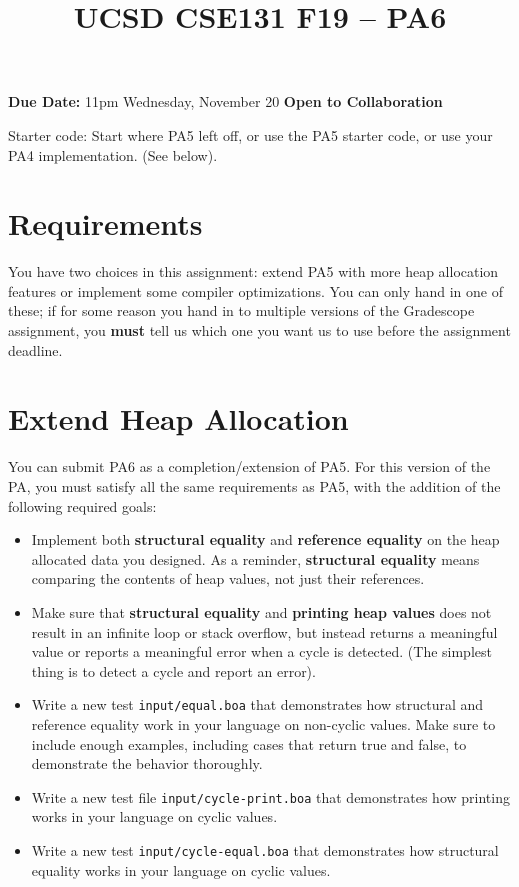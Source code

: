 \documentclass[10pt, oneside]{article}
\title{UCSD CSE131 F19 -- PA6}
\begin{document}
\maketitle 

{\bf Due Date:} 11pm Wednesday, November 20 \hspace{2em} {\bf Open to Collaboration}

Starter code: Start where PA5 left off, or use the PA5 starter code, or use
your PA4 implementation. (See below).

\section*{Requirements}

You have two choices in this assignment: extend PA5 with more heap allocation
features or implement some compiler optimizations. You can only hand in one
of these; if for some reason you hand in to multiple versions of the
Gradescope assignment, you {\bf must} tell us which one you want us to use
before the assignment deadline.

\section*{Extend Heap Allocation}

You can submit PA6 as a completion/extension of PA5. For this version of the
PA, you must satisfy all the same requirements as PA5, with the addition of
the following required goals:

\begin{itemize}
\item Implement both {\bf structural equality} and {\bf reference equality}
on the heap allocated data you designed. As a reminder, {\bf structural
equality} means comparing the contents of heap values, not just their
references.
\item Make sure that {\bf structural equality} and {\bf printing heap values}
does not result in an infinite loop or stack overflow, but instead returns a
meaningful value or reports a meaningful error when a cycle is detected. (The
simplest thing is to detect a cycle and report an error).
\item Write a new test {\tt input/equal.boa} that demonstrates how
structural and reference equality work in your language on non-cyclic values.
Make sure to include enough examples, including cases that return true and
false, to demonstrate the behavior thoroughly.
\item Write a new test file {\tt input/cycle-print.boa} that demonstrates how
printing works in your language on cyclic values.
\item Write a new test {\tt input/cycle-equal.boa} that demonstrates how
structural equality works in your language on cyclic values.
\end{itemize}
\end{document}
